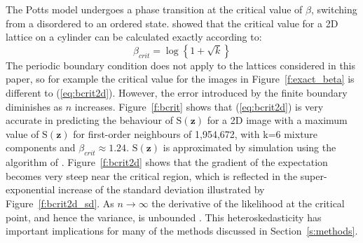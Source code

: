 \documentclass[nojss,shortnames]{jss}\usepackage[]{graphicx}\usepackage[]{color}
\begin{document}
The Potts model undergoes a phase transition at the critical value of $\beta$, switching from a disordered to an ordered state. \citet{Potts1952} showed that the critical value for a 2D lattice on a cylinder can be calculated exactly according to:
  \begin{equation}
  \label{eq:bcrit2d}
\beta_{crit} = \log\left\{1 + \sqrt{k}\right\}
  \end{equation}
The periodic boundary condition does not apply to the lattices considered in this paper, so for example the critical value for the images in Figure~\ref{f:exact_beta} is different to (\ref{eq:bcrit2d}). However, the error introduced by the finite boundary diminishes as $n$ increases. Figure~\ref{f:bcrit} shows that (\ref{eq:bcrit2d}) is very accurate in predicting the behaviour of $\mathrm{S}(\mathbf{z})$ for a 2D image with a maximum value of $\mathrm{S}(\mathbf{z})$ for first-order neighbours of 1,954,672, with k=6 mixture components and $\beta_{crit} \approx 1.24$. $\mathrm{S}(\mathbf{z})$ is approximated by simulation using the algorithm of \citet{Swendsen1987}. Figure~\ref{f:bcrit2d} shows that the gradient of the expectation becomes very steep near the critical region, which is reflected in the super-exponential increase of the standard deviation illustrated by Figure~\ref{f:bcrit2d_sd}. As $n \to \infty$ the derivative of the likelihood at the critical point, and hence the variance, is unbounded \citep{Pickard1987}. This heteroskedasticity has important implications for many of the methods discussed in Section~\ref{s:methods}. 
\end{document}
